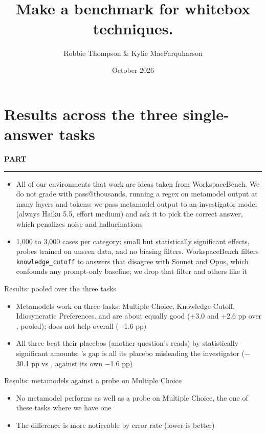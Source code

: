 \documentclass[aspectratio=169, 9pt, t]{beamer}
\title[Make a good benchmark for whitebox techniques]{%
  \struck{Make an excellent investigator agent}\\[3pt]
  \struck{Make a better counterfactual behaviour benchmark}\\[3pt]
  Make a benchmark for whitebox techniques.}
\author{Robbie Thompson \& Kylie MacFarquharson}
\institute{MATS sprint with Neel Nanda}
\date{October 2026}
\newcommand{\parthead}{%
  {\color{accent}\usebeamerfont{date}\bfseries\addfontfeatures{LetterSpace=8}PART \insertsectionnumber\par}\vspace{0.3mm}
  {\displayfont\bfseries\fontsize{12}{14}\selectfont \insertsectionhead\par}\vspace{0.6mm}
  {\color{accent}\rule{\textwidth}{0.5pt}}\par\smallskip}
\begin{document}
\maketitle

\section{Results across the three single-answer tasks}
\begin{frame}
  \parthead
  \begin{itemize}
    \item All of our environments that work are ideas taken from WorkspaceBench. We do not grade with pass@thousands, running a
      regex on metamodel output at many layers and tokens: we pass metamodel output to an investigator model (always Haiku 5.5,
      effort medium) and ask it to pick the correct answer, which penalizes noise and hallucinations
    \item 1,000 to 3,000 cases per category: small but statistically significant effects, probes trained on unseen data, and no
      biasing filters. WorkspaceBench filters \texttt{knowledge\_cutoff} to answers that disagree with Sonnet and Opus, which
      confounds any prompt-only baseline; we drop that filter and others like it
  \end{itemize}
\end{frame}

\begin{frame}{Results: pooled over the three tasks}
  \begin{itemize}
    \item Metamodels work on three tasks: Multiple Choice, Knowledge Cutoff, Idiosyncratic Preferences. \olens{} and \nla{} are
      about equally good (+3.0 and +2.6 pp over \promptonly, pooled); \jlens{} does not help overall ($-$1.6 pp)
    \item All three beat their placebos (another question's reads) by statistically significant amounts; \jlens's gap is all its
      placebo misleading the investigator ($-$30.1 pp vs \promptonly, against its own $-$1.6 pp)
  \end{itemize}
\end{frame}

\begin{frame}{Results: metamodels against a probe on Multiple Choice}
  \begin{itemize}
    \item No metamodel performs as well as a probe on Multiple Choice, the one of these tasks where we have one
    \item The difference is more noticeable by error rate (lower is better)
  \end{itemize}
\end{frame}
\end{document}
